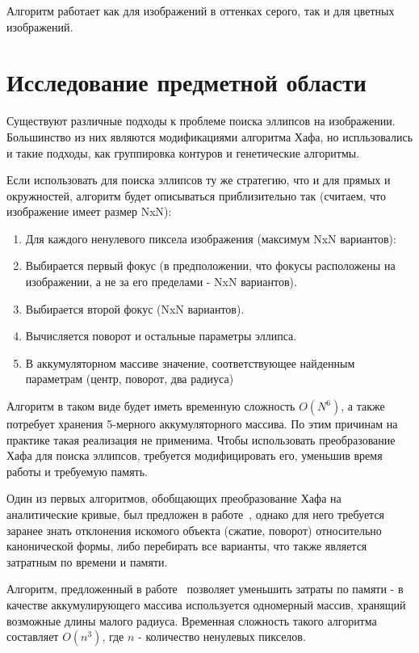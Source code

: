 Алгоритм работает как для изображений в оттенках серого, так и для цветных изображений.

\section{Исследование предметной области}
Существуют различные подходы к проблеме поиска эллипсов на изображении.  Большинство из них являются модификациями алгоритма Хафа, 
но испльзовались и такие подходы, как группировка контуров и генетические алгоритмы.

Если использовать для поиска эллипсов ту же стратегию, что и для прямых и окружностей, алгоритм будет описываться приблизительно так (считаем, что изображение имеет размер NxN):
\begin{enumerate}
\item Для каждого ненулевого пиксела изображения (максимум NxN вариантов):
\item Выбирается первый фокус (в предположении, что фокусы расположены на изображении, а не за его пределами - NxN вариантов).
\item Выбирается второй фокус (NxN вариантов).
\item Вычисляется поворот и остальные параметры эллипса.
\item В аккумуляторном массиве значение, соответствующее найденным параметрам (центр, поворот, два радиуса)
\end{enumerate}

Алгоритм в таком виде будет иметь временную сложность \(O(N^6)\), а также потребует хранения 5-мерного аккумуляторного массива. По этим причинам на практике такая реализация не применима.
Чтобы использовать преобразование Хафа для поиска эллипсов, требуется модифицировать его, уменьшив время работы и требуемую память.

Один из первых алгоритмов, обобщающих преобразование Хафа на аналитические кривые, был предложен в работе~\autocite{Ballard}, 
однако для него требуется заранее знать отклонения искомого объекта (сжатие, поворот) относительно канонической формы, либо перебирать все варианты, что также является затратным по времени и памяти.

Алгоритм, предложенный в работе~\autocite{OneDim} позволяет уменьшить затраты по памяти - в качестве аккумулирующего массива используется одномерный массив, хранящий возможные длины малого радиуса.
Временная сложность такого алгоритма составляет \(O(n^3)\), где \(n\) - количество ненулевых пикселов.

